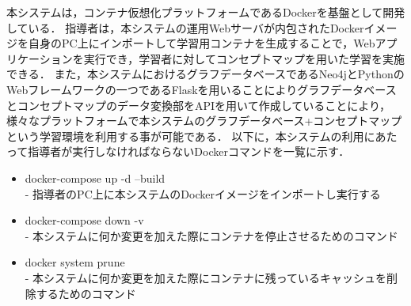 本システムは，コンテナ仮想化プラットフォームであるDockerを基盤として開発している．
指導者は，本システムの運用Webサーバが内包されたDockerイメージを自身のPC上にインポートして学習用コンテナを生成することで，Webアプリケーションを実行でき，学習者に対してコンセプトマップを用いた学習を実施できる．
また，本システムにおけるグラフデータベースであるNeo4jとPythonのWebフレームワークの一つであるFlaskを用いることによりグラフデータベースとコンセプトマップのデータ変換部をAPIを用いて作成していることにより，様々なプラットフォームで本システムのグラフデータべース+コンセプトマップという学習環境を利用する事が可能である．
以下に，本システムの利用にあたって指導者が実行しなければならないDockerコマンドを一覧に示す．

\begin{itemize}
    \item docker-compose up -d --build\\
    - 指導者のPC上に本システムのDockerイメージをインポートし実行する
    
    \item docker-compose down -v\\
    - 本システムに何か変更を加えた際にコンテナを停止させるためのコマンド

    \item docker system prune\\
    - 本システムに何か変更を加えた際にコンテナに残っているキャッシュを削除するためのコマンド
    
\end{itemize}
